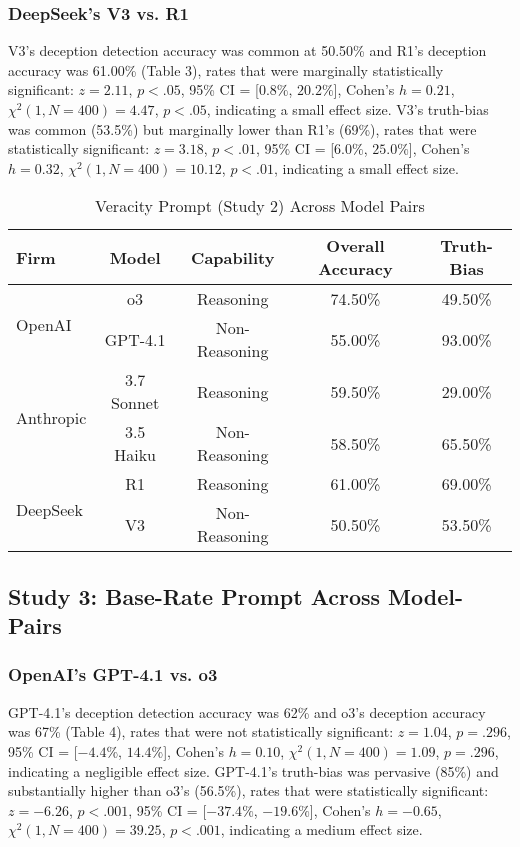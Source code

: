\documentclass{article}
\begin{document}
\subsubsection{DeepSeek's V3 vs. R1}

V3's deception detection accuracy was common at 50.50\% and R1's deception accuracy was 61.00\% (Table 3), rates that were marginally statistically significant:  $z = 2.11$, $p < .05$, 95\% CI = [$0.8\%$, $20.2\%$], Cohen’s $h =0.21$, $\chi^2(1, N = 400) = 4.47$, $p < .05$, indicating a small effect size. V3's truth-bias was common (53.5\%) but marginally lower than R1's (69\%), rates that were statistically significant: $z = 3.18$, $p < .01$, 95\% CI = [$6.0\%$, $25.0\%$], Cohen’s $h = 0.32$, $\chi^2(1, N = 400) = 10.12$, $p < .01$, indicating a small effect size.

\begin{table}[ht]
\centering
\caption{Veracity Prompt (Study 2) Across Model Pairs}
\begin{tabular}{lcccc}
\toprule
\textbf{Firm} & \textbf{Model} & \textbf{Capability} & \textbf{Overall Accuracy} & \textbf{Truth-Bias} \\
\midrule
\multirow{2}{*}{OpenAI} & o3 & Reasoning & 74.50\% & 49.50\%  \\
& GPT-4.1 & Non-Reasoning & 55.00\% & 93.00\% \\
\midrule
\multirow{2}{*}{Anthropic} & 3.7 Sonnet & Reasoning & 59.50\% & 29.00\% \\
& 3.5 Haiku & Non-Reasoning & 58.50\% & 65.50\% \\
\midrule
\multirow{2}{*}{DeepSeek} & R1 & Reasoning & 61.00\% & 69.00\% \\
& V3 & Non-Reasoning & 50.50\% & 53.50\% \\
\bottomrule
\end{tabular}
\label{tab:study2_model_comparison}
\end{table}

\subsection{Study 3: Base-Rate Prompt Across Model-Pairs}

\subsubsection{OpenAI's GPT-4.1 vs. o3}
 
GPT-4.1's deception detection accuracy was 62\% and o3's deception accuracy was 67\% (Table 4), rates that were not statistically significant:  $z = 1.04$, $p = .296$, 95\% CI = [$-4.4\%$, $14.4\%$], Cohen’s $h =0.10$, $\chi^2(1, N = 400) = 1.09$, $p = .296$, indicating a negligible effect size. GPT-4.1's truth-bias was pervasive (85\%) and substantially higher than o3's (56.5\%), rates that were statistically significant: $z = -6.26$, $p < .001$, 95\% CI = [$-37.4\%$, $-19.6\%$], Cohen’s $h = -0.65$, $\chi^2(1, N = 400) = 39.25$, $p < .001$, indicating a medium effect size.
\end{document}
